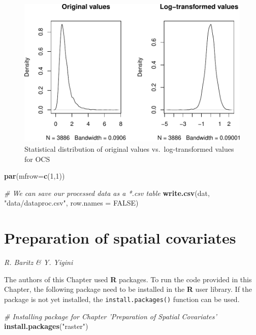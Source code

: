 \documentclass[10pt,b5paper,]{book}
\newenvironment{Shaded}{\begin{snugshade}}{\end{snugshade}}
\newcommand{\CommentTok}[1]{\textcolor[rgb]{0.56,0.35,0.01}{\textit{#1}}}
\newcommand{\DataTypeTok}[1]{\textcolor[rgb]{0.13,0.29,0.53}{#1}}
\newcommand{\DecValTok}[1]{\textcolor[rgb]{0.00,0.00,0.81}{#1}}
\newcommand{\KeywordTok}[1]{\textcolor[rgb]{0.13,0.29,0.53}{\textbf{#1}}}
\newcommand{\NormalTok}[1]{#1}
\newcommand{\OtherTok}[1]{\textcolor[rgb]{0.56,0.35,0.01}{#1}}
\newcommand{\StringTok}[1]{\textcolor[rgb]{0.31,0.60,0.02}{#1}}
\theoremstyle{definition}
\theoremstyle{definition}
\theoremstyle{definition}
\theoremstyle{remark}
\begin{document}
\begin{figure}
\centering
\includegraphics{SOCMapping_files/figure-latex/unnamed-chunk-16-1.pdf}
\caption{\label{fig:unnamed-chunk-16}Statistical distribution of original
values vs.~log-transformed values for OCS}
\end{figure}

\begin{Shaded}
\begin{Highlighting}[]
\KeywordTok{par}\NormalTok{(}\DataTypeTok{mfrow=}\KeywordTok{c}\NormalTok{(}\DecValTok{1}\NormalTok{,}\DecValTok{1}\NormalTok{))}

\CommentTok{# We can save our processed data as a *.csv table}
\KeywordTok{write.csv}\NormalTok{(dat, }\StringTok{"data/dataproc.csv"}\NormalTok{, }\DataTypeTok{row.names =} \OtherTok{FALSE}\NormalTok{)}
\end{Highlighting}
\end{Shaded}

\hypertarget{covariates}{%
\chapter{Preparation of spatial covariates}\label{covariates}}

\emph{R. Baritz \& Y. Yigini}

The authors of this Chapter used \textbf{R} packages. To run the code
provided in this Chapter, the following package need to be installed in
the \textbf{R} user library. If the package is not yet installed, the
\texttt{install.packages()} function can be used.

\begin{Shaded}
\begin{Highlighting}[]
\CommentTok{# Installing package for Chapter 'Preparation of Spatial Covariates'}
\KeywordTok{install.packages}\NormalTok{(}\StringTok{"raster"}\NormalTok{)}
\end{Highlighting}
\end{Shaded}
\end{document}
